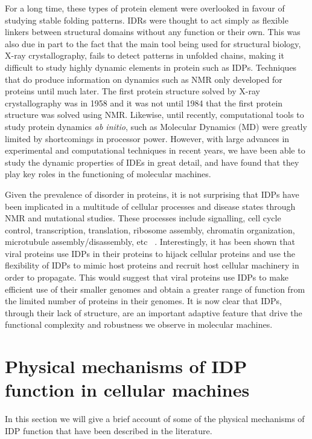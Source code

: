 For a long time, these types of protein element were overlooked in favour of studying stable folding patterns. IDRs were thought to act simply as flexible linkers between structural domains without any  function or their own. This was also due in part to the fact that the main tool being used for structural biology, X-ray crystallography, fails to detect patterns in unfolded chains, making it difficult to study highly dynamic elements in protein such as IDPs. Techniques that do produce information on dynamics such as NMR only developed for proteins until much later. The first protein structure solved by X-ray crystallography was in 1958 and it was not until 1984 that the first protein structure was solved using NMR. Likewise, until recently, computational tools to study protein dynamics {\it ab initio}, such as Molecular Dynamics (MD) were greatly limited by shortcomings in processor power. However, with large advances in experimental and computational techniques in recent years, we have been able to study the dynamic properties of IDEs in great detail, and have found that they play key roles in the functioning of molecular machines. 

Given the prevalence of disorder in proteins, it is not surprising that IDPs have been implicated in a multitude of cellular processes and disease states through NMR and mutational studies. These processes include signalling, cell cycle control, transcription, translation, ribosome assembly, chromatin organization, microtubule assembly/disassembly, etc ~\cite{wright2015intrinsically}. Interestingly, it has been shown that viral proteins use IDPs in their proteins to hijack cellular proteins and use the flexibility of IDPs to mimic host proteins and recruit host cellular machinery in order to propagate.\cite{davey2011viruses} This would suggest that viral proteins use IDPs to make efficient use of their smaller genomes and obtain a greater range of function from the limited number of proteins in their genomes. It is now clear that IDPs, through their lack of structure, are an important adaptive feature that drive the functional complexity and robustness we observe in molecular machines. \\

\section{Physical mechanisms of IDP function in cellular machines}

In this section we will give a brief account of some of the physical mechanisms of IDP function that have been described in the literature. \\

